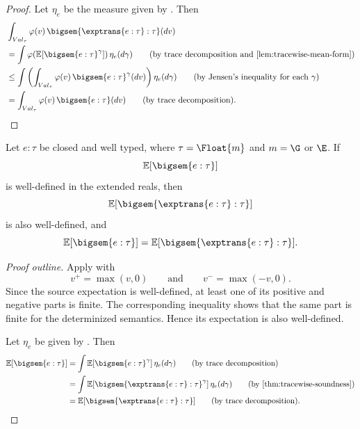 \begin{proof}
  Let $\eta_e$ be the measure given by
  . Then
  \begin{align}
    &\int_{Val_\tau}
      \varphi(v)\,
      \bigsem{\exptrans{e:\tau}:\tau}(dv)
    \notag
    \\
    &=
    \int
      \varphi\!\left(
        \mathbb E\!\left[
          \bigsem{e:\tau}^{\gamma}
        \right]
      \right)
      \eta_e(d\gamma)
    \tag{\text{by trace decomposition and
    \Cref{lem:tracewise-mean-form}}}
    \\
    &\leq
    \int
      \left(
        \int_{Val_\tau}
          \varphi(v)\,
          \bigsem{e:\tau}^{\gamma}(dv)
      \right)
      \eta_e(d\gamma)
    \tag{\text{by Jensen's inequality for each $\gamma$}}
    \\
    &=
    \int_{Val_\tau}
      \varphi(v)\,
      \bigsem{e:\tau}(dv)
    \tag{\text{by trace decomposition}}.
  \end{align}
\end{proof}





\begin{theorem}
  \label{thm:global-soundness-big-step}
  Let $e:\tau$ be closed and well typed, where
  $\tau=\Float{m}$ and $m=\G$ or $\E$.
  If
  \[
    \mathbb E[\bigsem{e:\tau}]
  \]
  is well-defined in the extended reals, then
  \[
    \mathbb E[\bigsem{\exptrans{e:\tau}:\tau}]
  \]
  is also well-defined, and
  \[
    \mathbb E[\bigsem{e:\tau}]
    =
    \mathbb E[\bigsem{\exptrans{e:\tau}:\tau}].
  \]
\end{theorem}

\begin{proof}[Proof outline]
  Apply  with
  \[
    v^+=\max(v,0)
    \qquad\text{and}\qquad
    v^-=\max(-v,0).
  \]
  Since the source expectation is well-defined, at least one of its
  positive and negative parts is finite. The corresponding inequality
  shows that the same part is finite for the determinized semantics.
  Hence its expectation is also well-defined.

  Let $\eta_e$ be given by . Then
  \begin{align}
    \mathbb E[\bigsem{e:\tau}]
    &=
    \int
      \mathbb E\!\left[
        \bigsem{e:\tau}^{\gamma}
      \right]
      \eta_e(d\gamma)
    \tag{\text{by trace decomposition}}
    \\
    &=
    \int
      \mathbb E\!\left[
        \bigsem{\exptrans{e:\tau}:\tau}^{\gamma}
      \right]
      \eta_e(d\gamma)
    \tag{\text{by \Cref{thm:tracewise-soundness}}}
    \\
    &=
    \mathbb E[
      \bigsem{\exptrans{e:\tau}:\tau}
    ]
    \tag{\text{by trace decomposition}}.
  \end{align}
\end{proof}

